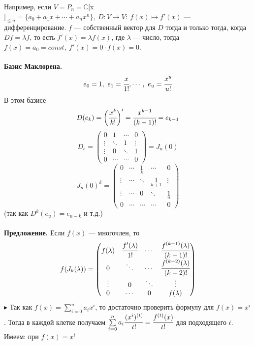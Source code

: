 \documentclass[12pt]{article}
\theoremstyle{definition}
\numberwithin{equation}{section}
\begin{document}
	Например, если $V=P_n=\mathbb{C}[$x$]_{\leqslant n}=\{a_0+a_1x+\cdots +a_nx^n\},~D:V\to V:~f(x) \mapsto f'(x)$ --- дифференцирование. $f$ --- собственный вектор для $D$ тогда и только тогда, когда $Df=\lambda f$, то есть $f'(x)=\lambda f(x)$, где $\lambda$ --- число, тогда $f(x)=a_0=const,~f'(x)=0\cdot f(x)=0$.\\
	\\
	\textbf{Базис Маклорена.}\\
	$$e_0=1,~e_1=\cfrac{x}{1!},\cdots,~e_u=\cfrac{x^u}{u!}$$
	В этом базисе
	$$D(e_k)=\bigg(\cfrac{x^k}{k!}\bigg)'=\cfrac{x^{k-1}}{(k-1)!}=e_{k-1}$$
	\[D_e = \begin{pmatrix}
	0 &  1 & \cdots & 0\\
	\vdots & \ddots & 1 & \vdots\\
	\vdots & 0 & \ddots & 1\\
	0 & \cdots & \cdots & 0
	\end{pmatrix} = J_n(0)\]
	\[J_n(0)^k = \begin{pmatrix}
	0 &  \cdots & \underset{k}{1} & \cdots & 0\\
	\vdots & \cdots & \ddots & \underset{k+1}{1} & \vdots\\
	\vdots & \cdots & 0 & \ddots & \underset{n}{1}\\
	0 & \cdots & \cdots & \cdots & 0
	\end{pmatrix}\]
	(так как $D^k(e_u)=e_{n-k}$ и т.д.)\\
	\\
	\textbf{Предложение.} Если $f(x)$ --- многочлен, то
	\[f(J_k(\lambda)) = \begin{pmatrix}
	f(\lambda) & \cfrac{f'(\lambda)}{1!} & \cdots & \cfrac{f^{(k-1)}(\lambda)}{(k-1)!}\\
	0 & \ddots & \cdots & \cfrac{f^{(k-2)}(\lambda)}{(k-2)!}\\
	\vdots & 0 & \ddots & \vdots\\
	0 & \cdots & 0 & f(\lambda)\\
	\end{pmatrix}\]
	$\blacktriangleright$ Так как $f(x)=\sum\limits_{i=0}^n a_ix^i$, то достаточно проверить формулу для $f(x)=x^i$. Тогда в каждой клетке получаем $\sum\limits_{i=0}^n a_i\cfrac{(x^i)^{(t)}}{t!}=\cfrac{f^{(t)}(x)}{t!}$ для подходящего $t$. \\
	Имеем: при $f(x)=x^i$
\end{document}
